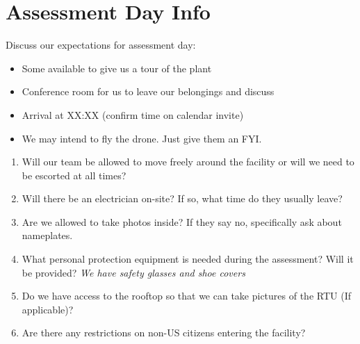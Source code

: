 \documentclass[./main.tex]{subfiles}
\begin{document}
\section*{Assessment Day Info}

\noindent Discuss our expectations for assessment day:

\begin{itemize}
    \item Some available to give us a tour of the plant
    \item Conference room for us to leave our belongings and discuss
    \item Arrival at XX:XX (confirm time on calendar invite)
    \item We may intend to fly the drone. Just give them an FYI. 
\end{itemize}

\begin{enumerate}[leftmargin=*]
\item Will our team be allowed to move freely around the facility or will we need to be escorted at all times? 

\vspace{\answerspace}

\item Will there be an electrician on-site? If so, what time do they usually leave? 

\vspace{\answerspace}

\item Are we allowed to take photos inside? If they say no, specifically ask about nameplates. 

\vspace{\answerspace}

\item What personal protection equipment is needed during the assessment? Will it be provided? \emph{We have safety glasses and shoe covers}

\vspace{\answerspace}

\item Do we have access to the rooftop so that we can take pictures of the RTU (If applicable)?

\vspace{\answerspace}

\item Are there any restrictions on non-US citizens entering the facility? 
\end{enumerate}


\end{document}

